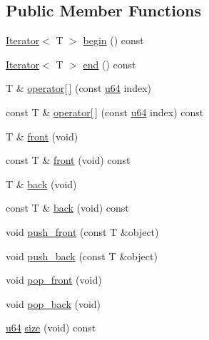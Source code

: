 \subsection*{Public Member Functions}
\begin{DoxyCompactItemize}
\item 
\hyperlink{class_iterator}{Iterator}$<$ T $>$ \hyperlink{classcrap_1_1container_1_1_deque_ad36e0df98057386c181b180e92bcf22a}{begin} () const
\item 
\hyperlink{class_iterator}{Iterator}$<$ T $>$ \hyperlink{classcrap_1_1container_1_1_deque_abdc37abbc75bb0bd840afc76512b3a32}{end} () const
\item 
T \& \hyperlink{classcrap_1_1container_1_1_deque_aea587674c04c94053813589d150ff033}{operator\mbox{[}$\,$\mbox{]}} (const \hyperlink{types_8h_a3f7e2bcbb0b4c338f3c4f6c937cd4234}{u64} index)
\item 
const T \& \hyperlink{classcrap_1_1container_1_1_deque_a6c89705377c6d669b4fecf247eea26ea}{operator\mbox{[}$\,$\mbox{]}} (const \hyperlink{types_8h_a3f7e2bcbb0b4c338f3c4f6c937cd4234}{u64} index) const
\item 
T \& \hyperlink{classcrap_1_1container_1_1_deque_a5d512da7fa47637855a58bc2d02c3be7}{front} (void)
\item 
const T \& \hyperlink{classcrap_1_1container_1_1_deque_af97a160e7935cb0ecd9612a762a69774}{front} (void) const
\item 
T \& \hyperlink{classcrap_1_1container_1_1_deque_a4c57aa7f28b4864a66bf9c01b8730186}{back} (void)
\item 
const T \& \hyperlink{classcrap_1_1container_1_1_deque_ac76054fa686a7483ee52369a1f889997}{back} (void) const
\item 
void \hyperlink{classcrap_1_1container_1_1_deque_ab65a41294d1f911a265f39f389f131b3}{push\-\_\-front} (const T \&object)
\item 
void \hyperlink{classcrap_1_1container_1_1_deque_aff97b8af994bfb403de8c7c05f71e034}{push\-\_\-back} (const T \&object)
\item 
void \hyperlink{classcrap_1_1container_1_1_deque_a0a4699d6174ae10cd22b58e8523c8b9b}{pop\-\_\-front} (void)
\item 
void \hyperlink{classcrap_1_1container_1_1_deque_a096a1ffb1aa87c7b6b5e21e22756b8b4}{pop\-\_\-back} (void)
\item 
\hyperlink{types_8h_a3f7e2bcbb0b4c338f3c4f6c937cd4234}{u64} \hyperlink{classcrap_1_1container_1_1_deque_adb4e1bbbe6dd2d0aefde481e6840cc6c}{size} (void) const
\item 

\end{DoxyCompactItemize}
